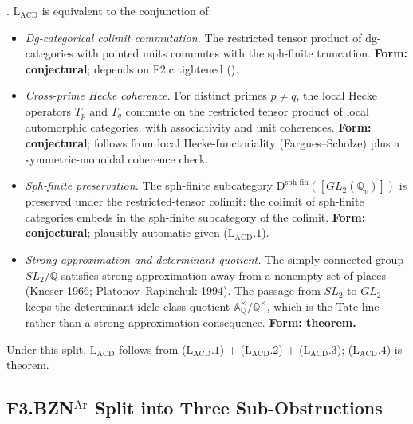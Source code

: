 \begin{theorem}
\label{v4-arith:sw:thm:LACD-split}
\ClaimStatusProvedHere. \(\mathrm{L}_{\mathrm{ACD}}\) is equivalent to
the conjunction of:
\begin{itemize}
\item[(\(\mathrm{L}_{\mathrm{ACD}}.1\))] \emph{Dg-categorical colimit
commutation.} The restricted tensor product of dg-categories
with pointed units commutes with the sph-finite truncation.
\textbf{Form: conjectural}; depends on F2.c tightened
().
\item[(\(\mathrm{L}_{\mathrm{ACD}}.2\))] \emph{Cross-prime Hecke
coherence.} For distinct primes \(p\neq q\), the local Hecke
operators \(T_{p}\) and \(T_{q}\) commute on the restricted tensor
product of local automorphic categories, with associativity and
unit coherences.
\textbf{Form: conjectural}; follows from local Hecke-functoriality
(Fargues--Scholze) plus a symmetric-monoidal coherence check.
\item[(\(\mathrm{L}_{\mathrm{ACD}}.3\))] \emph{Sph-finite preservation.}
The sph-finite subcategory
\(\mathrm{D}^{\mathrm{sph\text{-}fin}}([GL_{2}(\mathbb{Q}_{v})])\) is
preserved under the restricted-tensor colimit: the colimit of
sph-finite categories embeds in the sph-finite subcategory of the
colimit.
\textbf{Form: conjectural}; plausibly automatic given
(\(\mathrm{L}_{\mathrm{ACD}}.1\)).
\item[(\(\mathrm{L}_{\mathrm{ACD}}.4\))] \emph{Strong approximation and determinant quotient.}
The simply connected group \(SL_{2}/\mathbb{Q}\) satisfies strong
approximation away from a nonempty set of places (Kneser 1966;
Platonov--Rapinchuk 1994). The passage from \(SL_{2}\) to \(GL_{2}\)
keeps the determinant idele-class quotient
\(\mathbb{A}_{\mathbb{Q}}^{\times}/\mathbb{Q}^{\times}\), which is
the Tate line rather than a strong-approximation consequence.
\textbf{Form: theorem.}
\end{itemize}
Under this split, \(\mathrm{L}_{\mathrm{ACD}}\) follows from
(\(\mathrm{L}_{\mathrm{ACD}}.1\)) + (\(\mathrm{L}_{\mathrm{ACD}}.2\)) +
(\(\mathrm{L}_{\mathrm{ACD}}.3\)); (\(\mathrm{L}_{\mathrm{ACD}}.4\))
is theorem.
\end{theorem}

\subsection{\texorpdfstring{F3.BZN\(^{\mathrm{Ar}}\)}{F3-BZN-Ar} Split into Three Sub-Obstructions}

